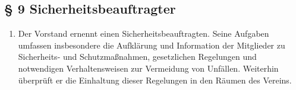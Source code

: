 \documentclass[10pt,a4paper]{article}
\begin{document}
\subsection*{§ 9 Sicherheitsbeauftragter}
\begin{enumerate}
\item Der Vorstand ernennt einen Sicherheitsbeauftragten. Seine Aufgaben
	umfassen insbesondere die Aufklärung und Information der Mitglieder
	zu Sicherheits- und Schutzmaßnahmen, gesetzlichen Regelungen und
	notwendigen Verhaltensweisen zur Vermeidung von Unfällen. Weiterhin
	überprüft er die Einhaltung dieser Regelungen in den Räumen des
	Vereins.
\end{enumerate}
\end{document}
